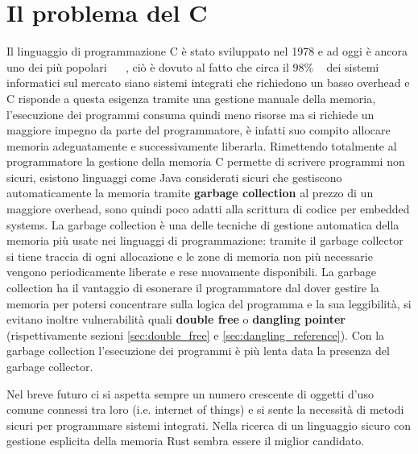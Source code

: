 \documentclass[Lau,binding=0.6cm]{sapthesis}
\begin{document}
\section{Il problema del C}
Il linguaggio di programmazione C è stato sviluppato nel 1978 e ad oggi è ancora uno dei più popolari ~\cite{tiobe:index} ~\cite{pypl:index}, ciò è dovuto al fatto che circa il 98\% ~\cite{real_men_program_in_c} dei sistemi informatici sul mercato siano sistemi integrati che richiedono un basso overhead e C risponde a questa esigenza tramite una gestione manuale della memoria, l'esecuzione dei programmi consuma quindi meno risorse ma si richiede un maggiore impegno da parte del programmatore, è infatti suo compito allocare memoria adeguatamente e successivamente liberarla. 
Rimettendo totalmente al programmatore la gestione della memoria C permette di scrivere programmi non sicuri, esistono linguaggi come Java considerati sicuri che gestiscono automaticamente la memoria tramite \textbf{garbage collection} al prezzo di un maggiore overhead, sono quindi poco adatti alla scrittura di codice per embedded systems.
La garbage collection è una delle tecniche di gestione automatica della memoria più usate nei linguaggi di programmazione: tramite il garbage collector si tiene traccia di ogni allocazione e le zone di memoria non più necessarie vengono periodicamente liberate e rese nuovamente disponibili. 
La garbage collection ha il vantaggio di esonerare il programmatore dal dover gestire la memoria per potersi concentrare sulla logica del programma e la sua leggibilità, si evitano inoltre vulnerabilità quali \textbf{double free} o \textbf{dangling pointer} (rispettivamente sezioni \ref{sec:double_free} e \ref{sec:dangling_reference}). 
Con la garbage collection l'esecuzione dei programmi è più lenta data la presenza del garbage collector.

Nel breve futuro ci si aspetta sempre un numero crescente di oggetti d'uso comune connessi tra loro (i.e. internet of things) e si sente la necessità di metodi sicuri per programmare sistemi integrati. 
Nella ricerca di un linguaggio sicuro con gestione esplicita della memoria Rust sembra essere il miglior candidato.
\end{document}
